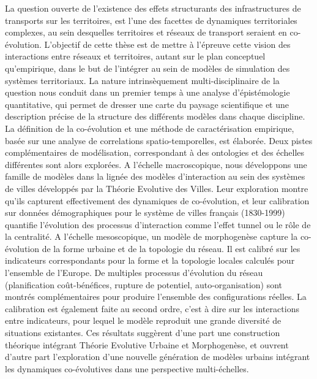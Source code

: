 La question ouverte de l'existence des effets structurants des infrastructures de transports sur les territoires, est l'une des facettes de dynamiques territoriales complexes, au sein desquelles territoires et réseaux de transport seraient en co-évolution. L'objectif de cette thèse est de mettre à l'épreuve cette vision des interactions entre réseaux et territoires, autant sur le plan conceptuel qu'empirique, dans le but de l'intégrer au sein de modèles de simulation des systèmes territoriaux. La nature intrinsèquement multi-disciplinaire de la question nous conduit dans un premier temps à une analyse d'épistémologie quantitative, qui permet de dresser une carte du paysage scientifique et une description précise de la structure des différents modèles dans chaque discipline. La définition de la co-évolution et une méthode de caractérisation empirique, basée sur une analyse de correlations spatio-temporelles, est élaborée. Deux pistes complémentaires de modélisation, correspondant à des ontologies et des échelles différentes sont alors explorées. A l'échelle macroscopique, nous développons une famille de modèles dans la lignée des modèles d'interaction au sein des systèmes de villes développés par la Théorie Evolutive des Villes. Leur exploration montre qu'ils capturent effectivement des dynamiques de co-évolution, et leur calibration sur données démographiques pour le système de villes français (1830-1999) quantifie l'évolution des processus d'interaction comme l'effet tunnel ou le rôle de la centralité. A l'échelle mesoscopique, un modèle de morphogenèse capture la co-évolution de la forme urbaine et de la topologie du réseau. Il est calibré sur les indicateurs correspondants pour la forme et la topologie locales calculés pour l'ensemble de l'Europe. De multiples processus d'évolution du réseau (planification coût-bénéfices, rupture de potentiel, auto-organisation) sont montrés complémentaires pour produire l'ensemble des configurations réelles. La calibration est également faite au second ordre, c'est à dire sur les interactions entre indicateurs, pour lequel le modèle reproduit une grande diversité de situations existantes. Ces résultats suggèrent d'une part une construction théorique intégrant Théorie Evolutive Urbaine et Morphogenèse, et ouvrent d'autre part l'exploration d'une nouvelle génération de modèles urbains intégrant les dynamiques co-évolutives dans une perspective multi-échelles.





